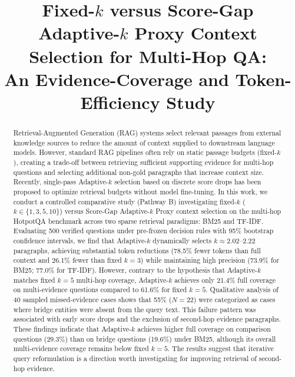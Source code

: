 \documentclass[conference]{IEEEtran}
\begin{document}
\title{Fixed-$k$ versus Score-Gap Adaptive-$k$ Proxy Context Selection for Multi-Hop QA:\\An Evidence-Coverage and Token-Efficiency Study}

\author{
}

\maketitle

\begin{abstract}
Retrieval-Augmented Generation (RAG) systems select relevant passages from external knowledge sources to reduce the amount of context supplied to downstream language models. However, standard RAG pipelines often rely on static passage budgets (fixed-$k$), creating a trade-off between retrieving sufficient supporting evidence for multi-hop questions and selecting additional non-gold paragraphs that increase context size. Recently, single-pass Adaptive-$k$ selection based on discrete score drops has been proposed to optimize retrieval budgets without model fine-tuning. In this work, we conduct a controlled comparative study (Pathway B) investigating fixed-$k$ ($k \in \{1, 3, 5, 10\}$) versus Score-Gap Adaptive-$k$ Proxy context selection on the multi-hop HotpotQA benchmark across two sparse retrieval paradigms: BM25 and TF-IDF. Evaluating 500 verified questions under pre-frozen decision rules with 95\% bootstrap confidence intervals, we find that Adaptive-$k$ dynamically selects $k \approx 2.02$--$2.22$ paragraphs, achieving substantial token reductions (78.5\% fewer tokens than full context and 26.1\% fewer than fixed $k=3$) while maintaining high precision (73.9\% for BM25; 77.0\% for TF-IDF). However, contrary to the hypothesis that Adaptive-$k$ matches fixed $k=5$ multi-hop coverage, Adaptive-$k$ achieves only 21.4\% full coverage on multi-evidence questions compared to 61.6\% for fixed $k=5$. Qualitative analysis of 40 sampled missed-evidence cases shows that 55\% ($N=22$) were categorized as cases where bridge entities were absent from the query text. This failure pattern was associated with early score drops and the exclusion of second-hop evidence paragraphs. These findings indicate that Adaptive-$k$ achieves higher full coverage on comparison questions (29.3\%) than on bridge questions (19.6\%) under BM25, although its overall multi-evidence coverage remains below fixed $k=5$. The results suggest that iterative query reformulation is a direction worth investigating for improving retrieval of second-hop evidence.
\end{abstract}
\end{document}
